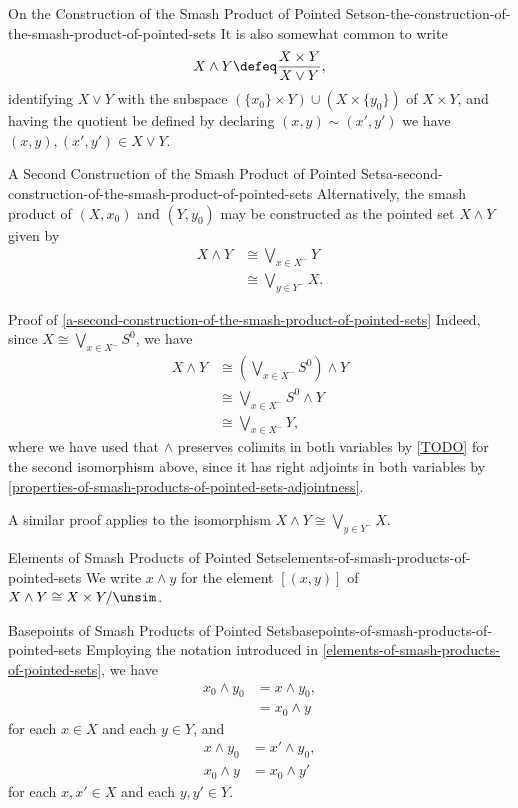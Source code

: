 \begin{remark}{On the Construction of the Smash Product of Pointed Sets}{on-the-construction-of-the-smash-product-of-pointed-sets}%
    It is also somewhat common to write
    \[
        X\wedge Y%
        \defeq%
        \frac{X\times Y}{X\vee Y},%
    \]%
    identifying $X\vee Y$ with the subspace $(\{x_{0}\}\times Y)\cup(X\times\{y_{0}\})$ of $X\times Y$, and having the quotient be defined by declaring $(x,y)\sim(x',y')$ \textiff we have $(x,y),(x',y')\in X\vee Y$.
\end{remark}
\begin{construction}{A Second Construction of the Smash Product of Pointed Sets}{a-second-construction-of-the-smash-product-of-pointed-sets}%
    Alternatively, the smash product of $(X,x_{0})$ and $(Y,y_{0})$ may be constructed as the pointed set $X\wedge Y$ given by
    \begin{align*}
        X\wedge Y &\cong \bigvee_{x\in X^{-}}Y\\%
                  &\cong \bigvee_{y\in Y^{-}}X.%
    \end{align*}
\end{construction}
\begin{Proof}{Proof of \cref{a-second-construction-of-the-smash-product-of-pointed-sets}}%
    Indeed, since $X\cong\bigvee_{x\in X^{-}}S^{0}$, we have
    \begin{align*}
        X\wedge Y &\cong (\bigvee_{x\in X^{-}}S^{0})\wedge Y\\
                  &\cong \bigvee_{x\in X^{-}}S^{0}\wedge Y\\
                  &\cong \bigvee_{x\in X^{-}}Y,
    \end{align*}
    where we have used that $\wedge$ preserves colimits in both variables by \cref{TODO} for the second isomorphism above, since it has right adjoints in both variables by \cref{properties-of-smash-products-of-pointed-sets-adjointness}.

    A similar proof applies to the isomorphism $X\wedge Y\cong\bigvee_{y\in Y^{-}}X$.
\end{Proof}
\begin{notation}{Elements of Smash Products of Pointed Sets}{elements-of-smash-products-of-pointed-sets}%
    We write $x\wedge y$ for the element $[(x,y)]$ of $X\wedge Y\cong X\times Y/\unsim$.%
\end{notation}
\begin{remark}{Basepoints of Smash Products of Pointed Sets}{basepoints-of-smash-products-of-pointed-sets}%
    Employing the notation introduced in \cref{elements-of-smash-products-of-pointed-sets}, we have
    \begin{align*}
        x_{0}\wedge y_{0} &= x\wedge y_{0},\\%
                          &= x_{0}\wedge y%
    \end{align*}
    for each $x\in X$ and each $y\in Y$, and
    \begin{align*}
        x\wedge y_{0} &= x'\wedge y_{0},\\%
        x_{0}\wedge y &= x_{0}\wedge y'%
    \end{align*}
    for each $x,x'\in X$ and each $y,y'\in Y$.
\end{remark}
